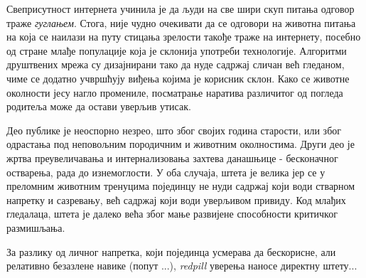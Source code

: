 \documentclass[b5paper]{article}
\begin{document}
Свеприсутност интернета учинила је да људи на све шири скуп питања одговор траже \textit{гуглањем}. Стога, није чудно очекивати да се одговори на животна питања на која се наилази на путу стицања зрелости такође траже на интернету, посебно од стране млађе популације која је склонија употреби технологије. Алгоритми друштвених мрежа су дизајнирани тако да нуде садржај сличан већ гледаном, чиме се додатно учвршћују виђења којима је корисник склон. Како се животне околности јесу нагло промениле, посматрање наратива различитог од погледа родитеља може да остави уверљив утисак.

Део публике је неоспорно незрео, што због својих година старости, или због одрастања под неповољним породичним и животним околностима. Други део је жртва преувеличавања и интернализовања захтева данашњице - бесконачног остварења, рада до изнемоглости. У оба случаја, штета је велика јер се у преломним животним тренуцима појединцу не нуди садржај који води стварном напретку и сазревању, већ садржај који води уверљивом привиду. Код млађих гледалаца, штета је далеко већа због мање развијене способности критичког размишљања.

За разлику од личног напретка, који појединца усмерава да бескорисне, али релативно безазлене навике (попут ...), \textit{redpill} уверења наносе директну штету...
\end{document}
